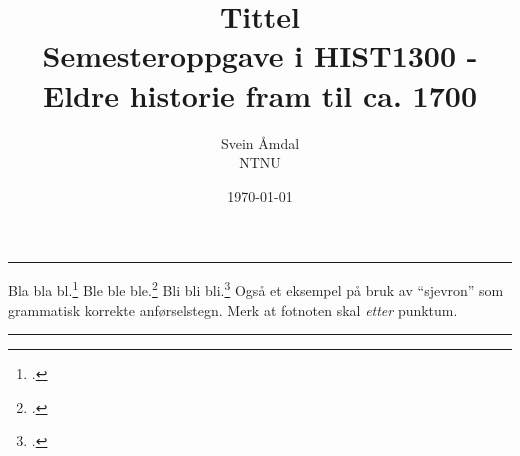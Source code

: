 \documentclass[12pt, a4paper, norsk]{article}
\title{\huge{\textbf{Tittel}}\\ \large{Semesteroppgave i HIST1300 - Eldre historie fram til ca. 1700}}
\author{\huge{Svein Åmdal} \\ \large{NTNU}}
\date{\today} %
\def\fc{\footcite}
\def\fcs{\footcites}
\begin{document}
\maketitle
\hrule
\vspace{1cm}
\thispagestyle{empty}
\clearpage
\setcounter{page}{1}

Bla bla bl.\fc{Pounds} Ble ble ble.\fc[27--30]{Ødegård} Bli bli bli.\fcs[4,22-23,45]{Wiesner-Hanks}[20]{Ødegård} Også et eksempel på bruk av \enquote{sjevron} som grammatisk korrekte anførselstegn. Merk at fotnoten skal \emph{etter} punktum.


% 

\lipsum[1-2]





\vspace{1cm}
\hrule
\printbibliography[title=Litteratur]
\end{document}
